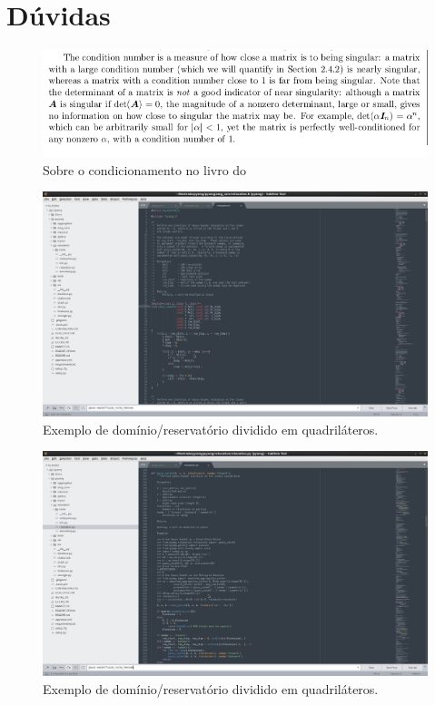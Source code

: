 \chapter{Dúvidas}


\begin{figure}[!htbp]
\centering
\includegraphics[width=1\textwidth]{Outros/condicionamento.png}
\caption{Sobre o condicionamento no livro do \citet{heath1997scientific}}
\label{fig:condicionamento}
\end{figure}

\begin{figure}[!htbp]
\centering
\includegraphics[width=1\textwidth]{Outros/gauss1.png}
\caption{Exemplo de domínio/reservatório dividido em quadriláteros.}
\label{fig:gauss1}
\end{figure}

\begin{figure}[!htbp]
\centering
\includegraphics[width=1\textwidth]{Outros/gauss2.png}
\caption{Exemplo de domínio/reservatório dividido em quadriláteros.}
\label{fig:gauss2}
\end{figure}